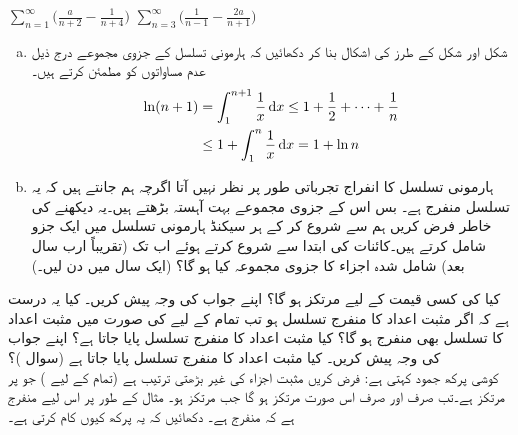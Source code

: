 $\sum\limits_{n=1}^{\infty}\big(\frac{a}{n+2}-\frac{1}{n+4}\big)$
$\sum\limits_{n=3}^{\infty}\big(\frac{1}{n-1}-\frac{2a}{n+1}\big)$
\begin{enumerate}[a.]
\item
شکل  اور شکل  کے طرز کی اشکال بنا کر دکھائیں کہ ہارمونی تسلسل کے جزوی مجموعے  درج ذیل عدم مساواتوں کو مطمئن کرتے ہیں۔ 
\begin{align*}
\ln(n+1)&=\int_1^{n+1}\frac{1}{x}\dif x\le 1+\frac{1}{2}+\cdots+\frac{1}{n}\\
&\le 1+\int_1^n\frac{1}{x}\dif x=1+\ln n
\end{align*}
%
\item
ہارمونی تسلسل کا  انفراج  تجرباتی طور پر  نظر نہیں آتا اگرچہ ہم جانتے ہیں کہ یہ تسلسل منفرج ہے۔ بس اس کے جزوی مجموعے  بہت آہستہ بڑھتے ہیں۔یہ دیکھنے کی خاطر فرض کریں ہم  سے شروع کر کے ہر سیکنڈ ہارمونی تسلسل میں ایک جزو شامل کرتے ہیں۔کائنات کی ابتدا سے شروع کرتے ہوئے اب تک (تقریباً  ارب  سال بعد) شامل شدہ  اجزاء کا جزوی مجموعہ کیا ہو گا؟ (ایک سال میں  دن لیں۔)
\end{enumerate}
کیا  کی   کسی قیمت کے لیے  مرتکز ہو گا؟ اپنے جواب کی وجہ پیش کریں۔
کیا یہ درست ہے کہ اگر  مثبت اعداد کا منفرج تسلسل ہو تب تمام  کے لیے  کی صورت میں مثبت اعداد کا   تسلسل  بھی منفرج ہو گا؟ کیا مثبت اعداد کا   منفرج تسلسل پایا جاتا ہے؟ اپنے جواب کی وجہ پیش کریں۔
کیا مثبت اعداد کا  منفرج تسلسل پایا جاتا ہے (سوال )؟
\\
کوشی پرکھ جمود کہتی ہے: فرض کریں  مثبت اجزاء کی غیر  بڑھتی  ترتیب ہے  (تمام  کے لیے )  جو  پر مرتکز ہے۔تب  صرف اور صرف اس صورت مرتکز ہو گا جب  مرتکز ہو۔ مثال کے طور پر   اس لیے منفرج  ہے کہ  منفرج ہے۔ دکھائیں کہ یہ پرکھ کیوں کام کرتی ہے۔
